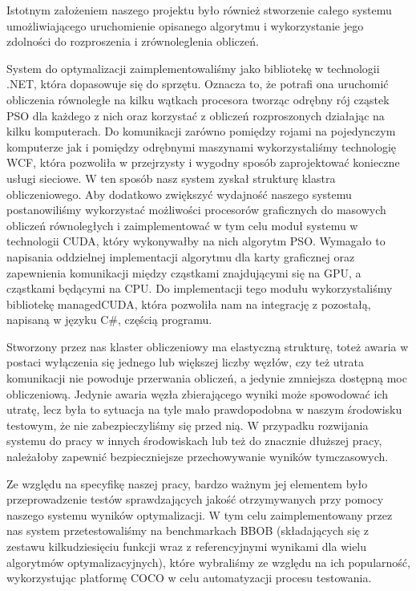 \documentclass[12pt, twoside, openany, abstract=on]{report}
\theoremstyle{definition}
\begin{document}
Istotnym założeniem naszego projektu było również stworzenie całego systemu umożliwiającego uruchomienie opisanego algorytmu i wykorzystanie jego zdolności do rozproszenia i zrównoleglenia obliczeń.

System do optymalizacji zaimplementowaliśmy jako bibliotekę w technologii .NET, która dopasowuje się do sprzętu. Oznacza to, że potrafi ona uruchomić obliczenia równoległe na kilku wątkach procesora tworząc odrębny rój cząstek PSO dla każdego z nich oraz korzystać z obliczeń rozproszonych działając na kilku komputerach. 
	Do komunikacji zarówno pomiędzy rojami na pojedynczym komputerze jak i pomiędzy odrębnymi maszynami wykorzystaliśmy technologię WCF, która pozwoliła w przejrzysty i wygodny sposób zaprojektować konieczne usługi sieciowe. W ten sposób nasz system zyskał strukturę klastra obliczeniowego.
	Aby dodatkowo zwiększyć wydajność naszego systemu postanowiliśmy wykorzystać możliwości procesorów graficznych do masowych obliczeń równoległych i zaimplementować w tym celu moduł systemu w technologii CUDA, który wykonywałby na nich algorytm PSO. Wymagało to napisania oddzielnej implementacji algorytmu dla karty graficznej oraz zapewnienia komunikacji między cząstkami znajdującymi się na GPU, a cząstkami będącymi na CPU. Do implementacji tego modułu wykorzystaliśmy bibliotekę managedCUDA, która pozwoliła nam na integrację z pozostałą, napisaną w języku C\#, częścią programu.
	
Stworzony przez nas klaster obliczeniowy ma elastyczną strukturę, toteż awaria w postaci wyłączenia się jednego lub większej liczby węzłów, czy też utrata komunikacji nie powoduje przerwania obliczeń, a jedynie zmniejsza dostępną moc obliczeniową. Jedynie awaria węzła zbierającego wyniki może spowodować ich utratę, lecz była to sytuacja na tyle mało prawdopodobna w naszym środowisku testowym, że nie zabezpieczyliśmy się przed nią. W przypadku rozwijania systemu do pracy w innych środowiskach lub też do znacznie dłuższej pracy, należałoby zapewnić bezpieczniejsze przechowywanie wyników tymczasowych.
	




Ze względu na specyfikę naszej pracy, bardzo ważnym jej elementem było przeprowadzenie testów sprawdzających jakość otrzymywanych przy pomocy naszego systemu wyników optymalizacji. W tym celu zaimplementowany przez nas system przetestowaliśmy na benchmarkach BBOB (składających się z zestawu kilkudziesięciu funkcji wraz z referencyjnymi wynikami dla wielu algorytmów optymalizacyjnych), które wybraliśmy ze względu na ich popularność, wykorzystując platformę COCO w celu automatyzacji procesu testowania.
\end{document}
